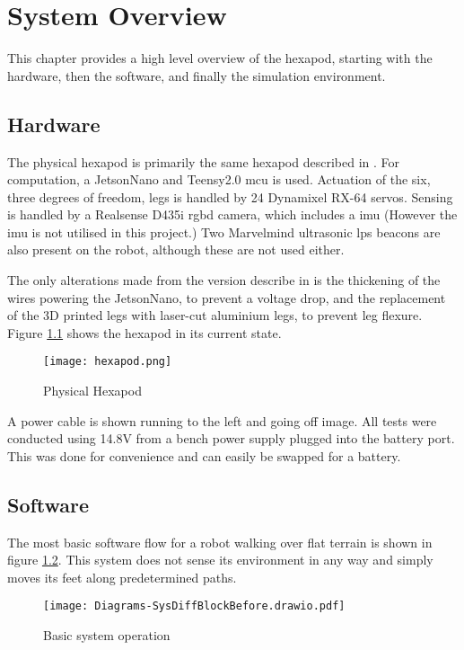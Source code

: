 \chapter{System Overview}
This chapter provides a high level overview of the hexapod, starting with the hardware, then the software, and finally the simulation
environment.
\section{Hardware}
The physical hexapod is primarily the same hexapod described in \cite{erasmus2023guidance}. For computation, a JetsonNano and Teensy2.0
\ac{mcu} is used. Actuation of the six, three degrees of freedom, legs is handled by 24 Dynamixel RX-64 servos. Sensing is handled by
a Realsense D435i \ac{rgbd} camera, which includes a \ac{imu} (However the \ac{imu} is not utilised in this project.) Two Marvelmind
ultrasonic \ac{lps} beacons are also present on the robot, although these are not used either.

The only alterations made from the version describe in \cite{erasmus2023guidance} is the thickening of the wires powering the JetsonNano,
to prevent a voltage drop, and the replacement of the 3D printed legs with laser-cut aluminium legs, to prevent leg flexure.
Figure \ref{fig:hexapod} shows the hexapod in its current state.
\begin{figure}[h]
    \centering
    \texttt{[image: hexapod.png]}
    \caption{Physical Hexapod}
    \label{fig:hexapod}
\end{figure}

\noindent
A power cable is shown running to the left and going off image. All tests were conducted using 14.8V
from a bench power supply plugged into the battery port. This was done for convenience and can easily be swapped for a battery.

\section{Software}
The most basic software flow for a robot walking over flat terrain is shown in figure \ref{fig:basic_sys}. This system does not sense
its environment in any way and simply moves its feet along predetermined paths.
\begin{figure}[h]
    \centering
    \texttt{[image: Diagrams-SysDiffBlockBefore.drawio.pdf]}
    \caption{Basic system operation}
    \label{fig:basic_sys}
\end{figure}

